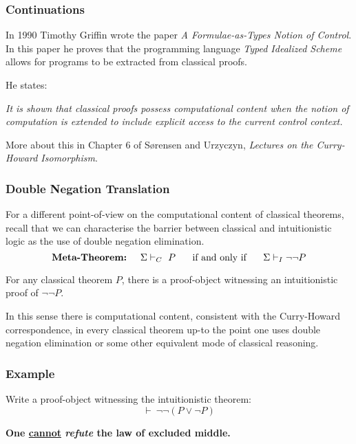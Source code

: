 \documentclass{beamer}
\theoremstyle{indentDefn} \newtheorem{defn}[]{Definition}
\begin{document}
\begin{frame}
  \frametitle{Continuations}


  In 1990 Timothy Griffin wrote the paper \emph{A Formulae-as-Types Notion of Control}. In this paper he proves that the programming language \emph{Typed Idealized Scheme} allows for programs to be extracted from classical proofs.

  \vspace{0.5cm}

  He states:

  \emph{It is shown that classical proofs possess computational content when the notion of computation is extended to include explicit access to the current control context.}

 More about this in Chapter 6 of S\o rensen and Urzyczyn, \emph{Lectures on the Curry-Howard Isomorphism}.

\end{frame}

\begin{frame}
  \frametitle{Double Negation Translation}

  For a different point-of-view on the computational content of classical theorems, recall that we can characterise the barrier between classical and intuitionistic logic as the use of double negation elimination.
  $$\text{{\bf Meta-Theorem:}} \hspace{0.5cm} \Sigma \vdash_{C} \ P \hspace{0.5cm} \text{ if and only if } \hspace{0.5cm} \Sigma \vdash_{I} \lnot\lnot P$$

  For any classical theorem $P$, there is a proof-object witnessing an intuitionistic proof of $\lnot \lnot P$. 

  \vspace{0.5cm}

  In this sense there is computational content, consistent with the Curry-Howard correspondence, in every classical theorem up-to the point one uses double negation elimination or some other equivalent mode of classical reasoning.

\end{frame}

\begin{frame}
  \frametitle{Example}

  Write a proof-object witnessing the intuitionistic theorem: $$ \vdash \ \lnot \lnot (P \lor \lnot P)$$
  

  \vspace{60mm}
  
  {\bf One \underline{cannot} \emph{refute} the law of excluded middle.}
\end{frame}
\end{document}
